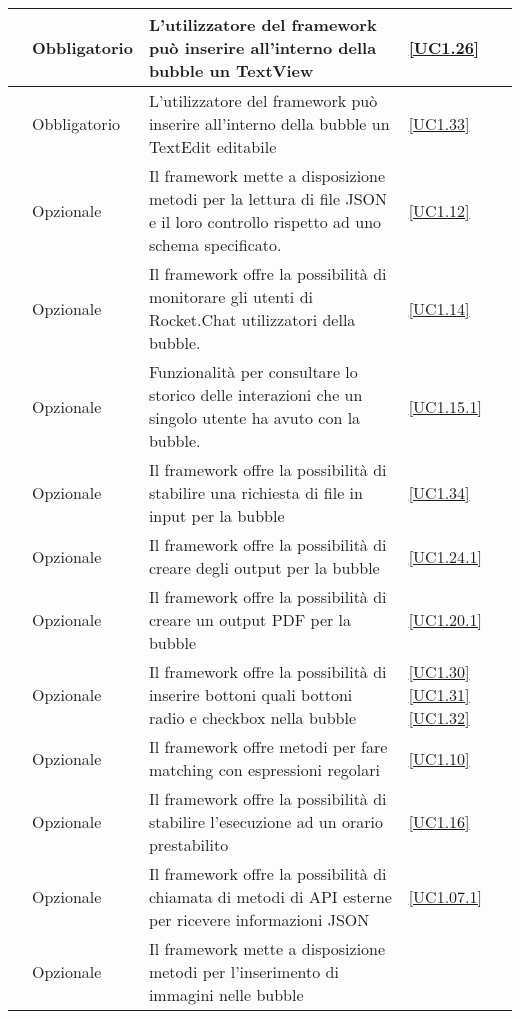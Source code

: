 \begin{longtable}{|P{1.5cm}|P{2.5cm}|P{6.5cm}|P{2.5cm}|}
	\hline \RequisitoObF\label{L33} & Obbligatorio & L'utilizzatore del framework può inserire all'interno della bubble un TextView & \ref{UC1.26} \\
	\hline \RequisitoObF\label{L34} & Obbligatorio & L'utilizzatore del framework può inserire all'interno della bubble un TextEdit editabile & \ref{UC1.33} \\
	\hline \RequisitoOpF\label{L35} & Opzionale & Il framework mette a disposizione metodi per la lettura di file JSON e il loro controllo rispetto ad uno schema specificato. & \ref{UC1.12} \\
	\hline \RequisitoOpF\label{L36} & Opzionale & Il framework offre la possibilità di monitorare gli utenti di Rocket.Chat utilizzatori della bubble. & \ref{UC1.14} \\
	\hline \RequisitoOpF\label{L37} & Opzionale & Funzionalità per consultare lo storico delle interazioni che un singolo utente ha avuto con la bubble. & \ref{UC1.15.1} \\
	\hline \RequisitoOpF\label{L38} & Opzionale & Il framework offre la possibilità di stabilire una richiesta di file in input per la bubble & \ref{UC1.34} \\
	\hline \RequisitoOpF\label{L39} & Opzionale & Il framework offre la possibilità di creare degli output per la bubble & \ref{UC1.24.1} \\
	\hline \RequisitoOpF\label{L40} & Opzionale & Il framework offre la possibilità di creare un output PDF per la bubble & \ref{UC1.20.1} \\	
	\hline \RequisitoOpF\label{L41} & Opzionale & Il framework offre la possibilità di inserire bottoni quali bottoni radio e checkbox nella bubble & \ref{UC1.30} \linebreak \ref{UC1.31} \linebreak \ref{UC1.32} \\
	\hline \RequisitoOpF\label{L42} & Opzionale & Il framework offre metodi per fare matching con espressioni regolari
	 & \ref{UC1.10} \\
	\hline \RequisitoOpF\label{L43} & Opzionale & Il framework offre la possibilità di stabilire l'esecuzione ad un orario prestabilito & \ref{UC1.16} \\
	\hline \RequisitoOpF\label{L44} & Opzionale & Il framework offre la possibilità di chiamata di metodi di API esterne per ricevere informazioni JSON & \ref{UC1.07.1} \\
	\hline \RequisitoOpF\label{L45} & Opzionale & Il framework mette a disposizione metodi per l'inserimento di immagini nelle bubble

\end{longtable}
